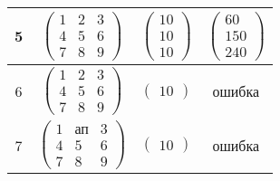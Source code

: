 \begin{table}[H]
\begin{center}
\begin{tabular}{|c|c|c|c|}
      5 &
      $\begin{pmatrix}
	  1 & 2 & 3 \\ 4 & 5 & 6 \\ 7 & 8 & 9
	  \end{pmatrix}$
      &
      $\begin{pmatrix}
	  10 \\ 10 \\ 10
	  \end{pmatrix}$
      &
      $\begin{pmatrix}
	  60 \\ 150 \\ 240
	  \end{pmatrix}$
      \\ \hline
      
      6 &
      $\begin{pmatrix}
	  1 & 2 & 3 \\ 4 & 5 & 6 \\ 7 & 8 & 9
	  \end{pmatrix}$
      &
      $\begin{pmatrix}
	  10
	  \end{pmatrix}$
      &
      ошибка
      \\ \hline
      
      7 &
      $\begin{pmatrix}
	  1 & \text{ап} & 3 \\ 4 & 5 & 6 \\ 7 & 8 & 9
	  \end{pmatrix}$
      &
      $\begin{pmatrix}
	  10
	  \end{pmatrix}$
      &
      ошибка
      \\ \hline
    \end{tabular}
  \end{center}
\end{table}

\newpage